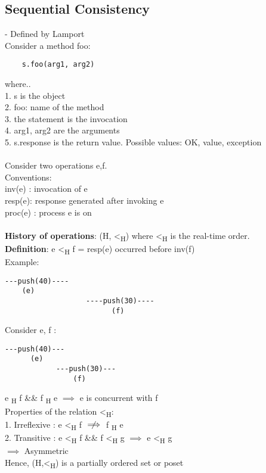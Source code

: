 \documentclass[twoside]{article}
\begin{document}
\subsection{Sequential Consistency}
- Defined by Lamport\\
Consider a method foo:
\begin{verbatim}
	s.foo(arg1, arg2)
\end{verbatim}
where.. \\
1. s is the object\\
2. foo: name of the method \\
3. the statement is the invocation\\
4. arg1, arg2 are the arguments\\
5. s.response is the return value. Possible values: OK, value, exception \\\\
Consider two operations e,f. \\
Conventions:\\
inv(e) : invocation of e\\
resp(e): response generated after invoking e\\
proc(e) : process e is on\\
\\
\textbf{History of operations}: (H, \textless\textsubscript{H}) where \textless\textsubscript{H} is the real-time order. \\
\textbf{Definition}: e \textless\textsubscript{H} f = resp(e) occurred before inv(f)\\
Example: 
\begin{verbatim}
---push(40)---- 
    (e)
                   ----push(30)----
                         (f)
\end{verbatim}

Consider e, f :
\begin{verbatim}
---push(40)---
      (e)
            ---push(30)---
                (f)
\end{verbatim}
e \cancel{\textless}\textsubscript{H} f \&\& f \cancel{\textless}\textsubscript{H} e $\implies$ e is concurrent with f\\

Properties of the relation \textless\textsubscript{H}:\\
1. Irreflexive : e \textless\textsubscript{H} f $\centernot\implies$ f \cancel{\textless}\textsubscript{H} e\\
2. Transitive : e \textless\textsubscript{H} f \&\& f \textless\textsubscript{H} g $\implies$ e \textless\textsubscript{H} g \\
$\implies$ Asymmetric\\
Hence, (H,\textless\textsubscript{H}) is a partially ordered set or poset
\end{document}
